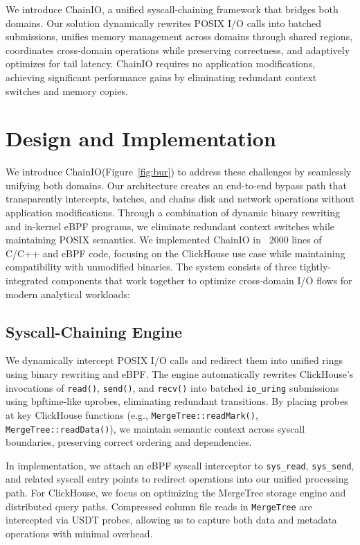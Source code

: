\documentclass[sigconf,10pt]{acmart}
\newcommand{\sys}{ChainIO\xspace}
\begin{document}
We introduce \sys, a unified syscall-chaining framework that bridges both domains. Our solution dynamically rewrites POSIX I/O calls into batched submissions, unifies memory management across domains through shared regions, coordinates cross-domain operations while preserving correctness, and adaptively optimizes for tail latency. \sys requires no application modifications, achieving significant performance gains by eliminating redundant context switches and memory copies.

\section{Design and Implementation}\label{sec:design-impl}

We introduce \sys (Figure~\ref{fig:bur}) to address these challenges by seamlessly unifying both domains. Our architecture creates an end-to-end bypass path that transparently intercepts, batches, and chains disk and network operations without application modifications. Through a combination of dynamic binary rewriting and in-kernel eBPF programs, we eliminate redundant context switches while maintaining POSIX semantics. We implemented \sys in ~2000 lines of C/C++ and eBPF code, focusing on the ClickHouse use case while maintaining compatibility with unmodified binaries. The system consists of three tightly-integrated components that work together to optimize cross-domain I/O flows for modern analytical workloads:

\subsection{Syscall-Chaining Engine}
We dynamically intercept POSIX I/O calls and redirect them into unified rings using binary rewriting and eBPF. The engine automatically rewrites ClickHouse's invocations of \texttt{read()}, \texttt{send()}, and \texttt{recv()} into batched \texttt{io\_uring} submissions using bpftime-like uprobes, eliminating redundant transitions. By placing probes at key ClickHouse functions (e.g., \texttt{MergeTree::readMark()}, \texttt{MergeTree::readData()}), we maintain semantic context across syscall boundaries, preserving correct ordering and dependencies.

In implementation, we attach an eBPF syscall interceptor to \texttt{sys\_read}, \texttt{sys\_send}, and related syscall entry points to redirect operations into our unified processing path. For ClickHouse, we focus on optimizing the MergeTree storage engine and distributed query paths. Compressed column file reads in \texttt{MergeTree} are intercepted via USDT probes, allowing us to capture both data and metadata operations with minimal overhead.
\end{document}
